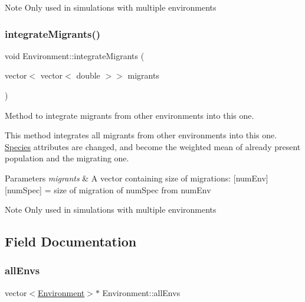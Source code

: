 \begin{DoxyNote}{Note}
Only used in simulations with multiple environments 
\end{DoxyNote}
\mbox{\label{classEnvironment_ae2fd5fc149c2eaf2a2e41af008fc5515}} 
\subsubsection{\texorpdfstring{integrate\+Migrants()}{integrateMigrants()}}
{\footnotesize\ttfamily void Environment\+::integrate\+Migrants (\begin{DoxyParamCaption}\item[{vector$<$ vector$<$ double $>$$>$}]{migrants }\end{DoxyParamCaption})}



Method to integrate migrants from other environments into this one. 

This method integrates all migrants from other environments into this one. \hyperlink{classSpecies}{Species} attributes are changed, and become the weighted mean of already present population and the migrating one.


\begin{DoxyParams}{Parameters}
{\em migrants} & A vector containing size of migrations\+: \mbox{[}num\+Env\mbox{]}\mbox{[}num\+Spec\mbox{]} = size of migration of num\+Spec from num\+Env \\
\hline
\end{DoxyParams}
\begin{DoxyNote}{Note}
Only used in simulations with multiple environments 
\end{DoxyNote}


\subsection{Field Documentation}
\mbox{\label{classEnvironment_a429ca4342b5a89b28be803c166a48c71}} 
\subsubsection{\texorpdfstring{all\+Envs}{allEnvs}}
{\footnotesize\ttfamily vector$<$\hyperlink{classEnvironment}{Environment}$>$$\ast$ Environment\+::all\+Envs\hspace{0.3cm}{\ttfamily [protected]}}


